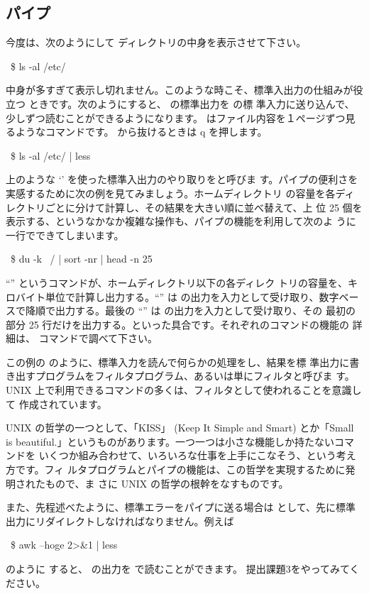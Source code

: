 \documentclass[platex]{jsarticle}
\begin{document}
 \subsection{パイプ}
 今度は、次のようにして  ディレクトリの中身を表示させて下さい。
 \begin{terminal}~\$ ls -al /etc/\end{terminal}
 中身が多すぎて表示し切れません。このような時こそ、標準入出力の仕組みが役立つ
 ときです。次のようにすると、 の標準出力を  の標
 準入力に送り込んで、少しずつ読むことができるようになります。
  はファイル内容を１ページずつ見るようなコマンドです。
  から抜けるときは q を押します。
 \begin{terminal}~\$ ls -al /etc/ | less\end{terminal}
 上のような `\term{|}' を使った標準入出力のやり取りをと呼びま
 す。パイプの便利さを実感するために次の例を見てみましょう。ホームディレクトリ
 の容量を各ディレクトリごとに分けて計算し、その結果を大きい順に並べ替えて、上
 位 25 個を表示する、というなかなか複雑な操作も、パイプの機能を利用して次のよ
 うに一行でできてしまいます。
 \begin{terminal}~\$ du -k ~/ | sort -nr | head -n 25\end{terminal}
 ``'' というコマンドが、ホームディレクトリ以下の各ディレク
 トリの容量を、キロバイト単位で計算し出力する。``'' は
  の出力を入力として受け取り、数字ベースで降順で出力する。最後の
 ``'' は  の出力を入力として受け取り、その
 最初の部分 25 行だけを出力する。といった具合です。それぞれのコマンドの機能の
 詳細は、 コマンドで調べて下さい。

 この例の  のように、標準入力を読んで何らかの処理をし、結果を標
 準出力に書き出すプログラムをフィルタプログラム、あるいは単にフィルタと呼びま
 す。UNIX 上で利用できるコマンドの多くは、フィルタとして使われることを意識して
 作成されています。
 \begin{プチノート}
  UNIX の哲学の一つとして、「KISS」 (Keep It Simple and Smart) とか「Small is
  beautiful.」というものがあります。一つ一つは小さな機能しか持たないコマンドを
  いくつか組み合わせて、いろいろな仕事を上手にこなそう、という考え方です。フィ
  ルタプログラムとパイプの機能は、この哲学を実現するために発明されたもので、ま
  さに UNIX の哲学の根幹をなすものです。
 \end{プチノート}

 また、先程述べたように、標準エラーをパイプに送る場合は 
 として、先に標準出力にリダイレクトしなければなりません。例えば
 \begin{terminal}~\$ awk --hoge 2>&1 | less\end{terminal} のように
 すると、  の出力を 
 で読むことができます。
 提出課題3をやってみてください。
\end{document}
